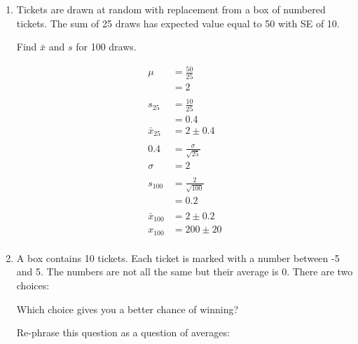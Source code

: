 \documentclass[letterpaper,landscape]{exam}
\begin{document}
\begin{enumerate}
\begin{solution}
      \end{solution}

    \item Tickets are drawn at random with replacement from a box of numbered
      tickets. The sum of 25 draws has expected value equal to 50 with SE of 10.

      Find $\bar{x}$ and $s$ for 100 draws.

      \begin{solution}
        \begin{align*}
          \mu      & = \frac{50}{25} \\
          &= 2 \\
          \\
          s_{25}       & = \frac{10}{25} \\
                       & = 0.4 \\
          \bar{x}_{25} & = 2 \pm 0.4 \\
          \\
          0.4    & = \frac{\sigma}{\sqrt{25}} \\
          \sigma & = 2 \\
          \\
          s_{100} & = \frac{2}{\sqrt{100}} \\
                  & = 0.2 \\
          \\
          \bar{x}_{100} & = 2 \pm 0.2 \\
          x_{100}       & = 200 \pm 20 \\
        \end{align*}
        
      \end{solution}

    \item A box contains 10 tickets. Each ticket is marked with a number between
      -5 and 5. The numbers are not all the same but their average is 0. There
      are two choices:

      Which choice gives you a better chance of winning?

      \begin{solution}
        Re-phrase this question as a question of averages:


\end{solution}
\end{enumerate}
\end{document}
